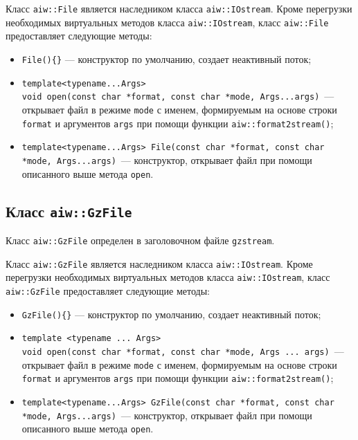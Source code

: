 Класс \verb'aiw::File' является наследником класса \verb'aiw::IOstream'. Кроме перегрузки необходимых
виртуальных методов класса \verb'aiw::IOstream', класс \verb'aiw::File' предоставляет следующие методы:
\begin{itemize}
\item \verb'File(){}' --- конструктор по умолчанию, создает неактивный поток;
\item \verb'template<typename...Args>'\\\verb'void open(const char *format, const char *mode, Args...args)'~---
  открывает файл в режиме \verb'mode' с именем, формируемым на основе строки \verb'format' и аргументов \verb'args'
  при помощи функции  \verb'aiw::format2stream()';
\item \verb'template<typename...Args> File(const char *format, const char *mode, Args...args)'~---
  конструктор, открывает файл при помощи описанного выше метода \verb'open'.
\end{itemize}

\subsection{Класс {\tt aiw::GzFile}}
Класс \verb'aiw::GzFile' определен в заголовочном файле \verb'gzstream'.

Класс \verb'aiw::GzFile' является наследником класса \verb'aiw::IOstream'. Кроме перегрузки необходимых
виртуальных методов класса \verb'aiw::IOstream', класс \verb'aiw::GzFile' предоставляет следующие методы:
\begin{itemize}
\item \verb'GzFile(){}' --- конструктор по умолчанию, создает неактивный поток;
\item \verb'template <typename ... Args>'\\\verb'void open(const char *format, const char *mode, Args ... args)'~---
  открывает файл в режиме \verb'mode' с именем, формируемым на основе строки \verb'format' и аргументов \verb'args'
  при помощи функции  \verb'aiw::format2stream()';
\item \verb'template<typename...Args> GzFile(const char *format, const char *mode, Args...args)'~---
  конструктор, открывает файл при помощи описанного выше метода \verb'open'.
\end{itemize}

